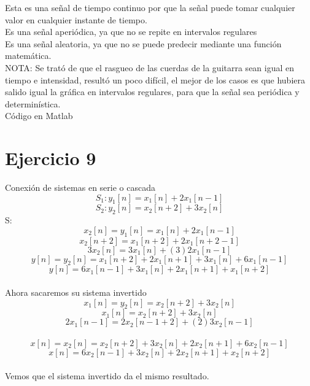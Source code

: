 \documentclass[10pt,a4paper]{report}
\begin{document}
\begin{enumerate}
Esta es una señal de tiempo continuo por que la señal puede tomar cualquier valor en cualquier instante de tiempo. \\
Es una señal aperiódica, ya que no se repite en intervalos regulares \\
Es una señal aleatoria, ya que no se puede predecir mediante una función matemática.\\
NOTA: Se trató de que el rasgueo de las cuerdas de la guitarra sean igual en tiempo e intensidad, resultó un poco difícil, el mejor de los casos es que hubiera salido igual la gráfica en intervalos regulares, para que la señal sea periódica y determinística.\\
\newline Código en Matlab
    

\end{enumerate}

\section{Ejercicio 9}

Conexión de sistemas en serie o cascada\\
\[ S_{1}: y_{1}\left[ n \right]=x_{1}\left[ n \right]+2x_{1}\left[ n-1 \right] \]
\[ S_{2}: y_{2}\left[ n \right]=x_{2}\left[ n+2 \right]+3x_{2}\left[ n \right] \]
S:
\[ x_{2}\left[ n \right]=y_{1}\left[ n \right]=x_{1}\left[ n \right]+2x_{1}\left[ n-1 \right] \]
\[ x_{2}\left[ n+2 \right]=x_{1}\left[ n+2 \right]+2x_{1}\left[ n+2-1 \right] \]
\[ 3x_{2}\left[ n \right]=3x_{1}\left[ n \right]+(3)2x_{1}\left[ n-1 \right] \]
\[ y\left[ n \right]=y_{2}\left[ n \right]=x_{1}\left[ n+2 \right]+2x_{1}\left[ n+1 \right]+3x_{1}\left[ n \right]+6x_{1}\left[ n-1 \right] \]
\[ y\left[ n \right]=6x_{1}\left[ n-1 \right]+3x_{1}\left[ n \right]+2x_{1}\left[ n+1 \right]+x_{1}\left[ n+2 \right] \]\\
Ahora sacaremos su sistema invertido\\
\[ x_{1}\left[ n \right]=y_{2}\left[ n \right]=x_{2}\left[ n+2 \right]+3x_{2}\left[ n \right] \]
\[ x_{1}\left[ n \right]=x_{2}\left[ n+2 \right]+3x_{2}\left[ n \right] \]
\[ 2x_{1}\left[ n-1 \right]=2x_{2}\left[ n-1+2 \right]+(2)3x_{2}\left[ n-1 \right] \]\\
\[ x\left[ n \right]=x_{2}\left[ n \right]=x_{2}\left[ n+2 \right]+3x_{2}\left[ n \right]+2x_{2}\left[ n+1 \right]+6x_{2}\left[ n-1 \right] \]
\[ x\left[ n \right]=6x_{2}\left[ n-1 \right]+3x_{2}\left[ n \right]+2x_{2}\left[ n+1 \right]+x_{2}\left[ n+2 \right] \]\\
Vemos que el sistema invertido da el mismo resultado.
\end{document}
